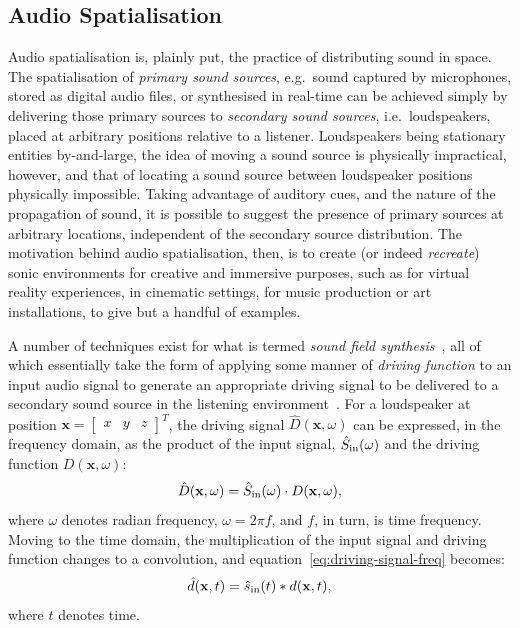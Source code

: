 \subsection{Audio Spatialisation}\label{subsec:audio-spatialisation}

Audio spatialisation is, plainly put, the practice of distributing sound in
space.
The spatialisation of \textit{primary sound sources}, e.g.\ sound
captured by microphones, stored as digital audio files, or synthesised in
real-time can be achieved simply by delivering those primary sources to
\textit{secondary sound sources}, i.e.\ loudspeakers, placed at arbitrary
positions relative to a listener.
Loudspeakers being stationary entities by-and-large, the idea of moving a sound
source is physically impractical, however, and that of locating a sound source
between loudspeaker positions physically impossible.
Taking advantage of auditory cues, and the nature of the propagation of sound,
it is possible to suggest the presence of primary sources at arbitrary
locations, independent of the secondary source distribution.
The motivation behind audio spatialisation, then, is to create (or indeed
\textit{recreate}) sonic environments for creative and immersive purposes, such
as for virtual reality experiences, in cinematic settings, for music production
or art installations, to give but a handful of examples.

A number of techniques exist for what is termed \textit{sound field
synthesis}~\citep{ahrens_analytic_2012,nicol_sound_2017}, all of which
essentially take the form of applying some manner of \textit{driving function}
to an input audio signal to generate an appropriate driving signal to be
delivered to a secondary sound source in the listening
environment~\citep{ahrens_analytic_2012}.
For a loudspeaker at position $\mathbf{x} = \begin{bmatrix}
                                                x & y & z
\end{bmatrix}^T$, the driving signal $\hat{D}(\mathbf{x}, \omega)$ can be
expressed, in the frequency domain, as the product of the input signal,
$\hat{S}_{\text{in}}(\omega)$ and the driving function $D(\mathbf{x}, \omega)$:
\begin{equation}
    \label{eq:driving-signal-freq}
    \hat{D}(\mathbf{x},\omega) = \hat{S}_{\text{in}}(\omega) \cdot D(\mathbf{x},\omega),
\end{equation}
where $\omega$ denotes radian frequency, $\omega = 2\pi f$, and $f$, in turn,
is time frequency.
Moving to the time domain, the multiplication of the input signal and driving
function changes to a convolution, and equation~\eqref{eq:driving-signal-freq}
becomes:
\begin{equation}
    \label{eq:driving-signal-time}
    \hat{d}(\mathbf{x},t) = \hat{s}_{\text{in}}(t) \ast d(\mathbf{x},t),
\end{equation}
where $t$ denotes time.

